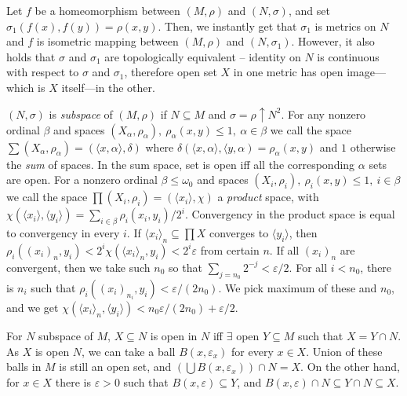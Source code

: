 Let $f$ be a homeomorphism between $(M,\rho)$ and $(N,\sigma)$, and set 
$\sigma_1(f(x),f(y)) = \rho(x,y)$. Then, we instantly get that $\sigma_1$ 
is metrics on $N$ and $f$ is isometric mapping between $(M,\rho)$ and 
$(N,\sigma_1)$. However, it also holds that $\sigma$ and $\sigma_1$ are 
topologically equivalent -- identity on $N$ is continuous with respect to 
$\sigma$ and $\sigma_1$, therefore open set $X$ in one metric has open 
image---which is $X$ itself---in the other.

\medskip

 $(N,\sigma)$ is {\it subspace} of $(M,\rho)$ if 
$N\subseteq M$ and $\sigma = \rho\uparrow N^2$. 
\smallskip
{}
For any nonzero ordinal $\beta$ and spaces $(X_\alpha,\rho_\alpha),\ 
\rho_\alpha(x,y)\leq 1,\ \alpha \in \beta$ we call the 
space $\sum (X_\alpha,\rho_\alpha) = (\langle x,\alpha\rangle, \delta)$ where 
$\delta(\langle x,\alpha\rangle,\langle y,\alpha) = \rho_\alpha(x,y)$ and 
$1$ otherwise the {\it sum} of spaces. In the sum space, set is open iff 
all the corresponding $\alpha$ sets are open.
\smallskip
{} For a nonzero ordinal $\beta \leq \omega_0$ and spaces 
$(X_i,\rho_i),\ \rho_i(x,y)\leq 1,\ i \in \beta$ 
we call the space $\prod (X_i,\rho_i) = (\langle x_i
\rangle, \chi)$ a {\it product} space, with $\chi(\langle x_i\rangle, 
\langle y_i \rangle) = \sum_{i\in \beta} \rho_i(x_i,y_i) / 2^i$.
Convergency in the product space is equal to convergency in every $i$.
If $\langle x_i\rangle_n \subseteq\prod X$ converges to $\langle y_i
\rangle$, then $\rho_i(
(x_i)_n, y_i) < 2^i \chi(\langle x_i\rangle_n, y_i) < 2^i \varepsilon$ from 
certain $n$. If all $(x_i)_n$ are convergent, then we take such $n_0$ so 
that $\sum_{j=n_0} 2^{-j} < \varepsilon/2$. For all $i < n_0$, there is 
$n_i$ such that $\rho_i((x_i)_{n_i},y_i) < \varepsilon/(2n_0)$. We pick maximum 
of these and $n_0$, and we get $\chi(\langle x_i\rangle_n, \langle y_i\rangle)
< n_0\varepsilon/(2n_0) + \varepsilon/2$.

\medskip
For $N$ subspace of $M$, $X\subseteq N$ is open in $N$ iff $\exists$ open 
$Y\subseteq M$ such that $X = Y\cap N$. As $X$ is open $N$, we can take 
a ball $B(x,\varepsilon_x)$ for every $x\in X$. Union of these balls in 
$M$ is still an open set, and $(\bigcup B(x,\varepsilon_x)) \cap N = X$.
On the other hand, for $x\in X$ there is $\varepsilon >0$ such that 
$B(x,\varepsilon)\subseteq Y$, and $B(x,\varepsilon)\cap N \subseteq 
Y\cap N \subseteq X$.

